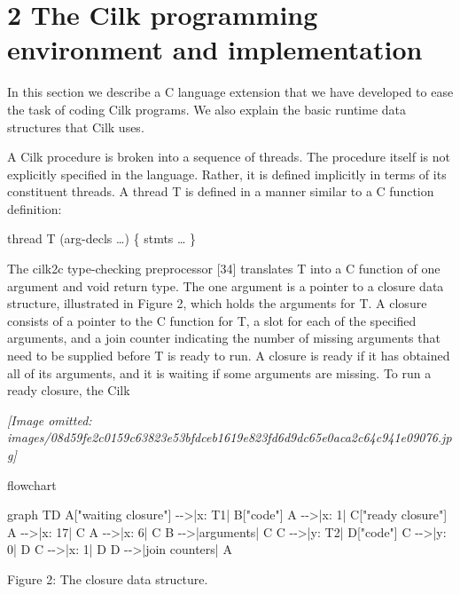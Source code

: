 \documentclass[
]{article}
\newenvironment{Shaded}{}{}
\newcommand{\NormalTok}[1]{#1}
\begin{document}
\section{2 The Cilk programming environment and
implementation}\label{the-cilk-programming-environment-and-implementation}

In this section we describe a C language extension that we have
developed to ease the task of coding Cilk programs. We also explain the
basic runtime data structures that Cilk uses.

A Cilk procedure is broken into a sequence of threads. The procedure
itself is not explicitly specified in the language. Rather, it is
defined implicitly in terms of its constituent threads. A thread T is
defined in a manner similar to a C function definition:

thread T (arg-decls \ldots) \{ stmts \ldots{} \}

The cilk2c type-checking preprocessor {[}34{]} translates T into a C
function of one argument and void return type. The one argument is a
pointer to a closure data structure, illustrated in Figure 2, which
holds the arguments for T. A closure consists of a pointer to the C
function for T, a slot for each of the specified arguments, and a join
counter indicating the number of missing arguments that need to be
supplied before T is ready to run. A closure is ready if it has obtained
all of its arguments, and it is waiting if some arguments are missing.
To run a ready closure, the Cilk

\textit{[Image omitted: images/08d59fe2c0159c63823e53bfdceb1619e823fd6d9dc65e0aca2c64c941e09076.jpg]}

flowchart

\begin{Shaded}
\begin{Highlighting}[]
\NormalTok{graph TD}
\NormalTok{    A["waiting closure"] {-}{-}\textgreater{}|x: T1| B["code"]}
\NormalTok{    A {-}{-}\textgreater{}|x: 1| C["ready closure"]}
\NormalTok{    A {-}{-}\textgreater{}|x: 17| C}
\NormalTok{    A {-}{-}\textgreater{}|x: 6| C}
\NormalTok{    B {-}{-}\textgreater{}|arguments| C}
\NormalTok{    C {-}{-}\textgreater{}|y: T2| D["code"]}
\NormalTok{    C {-}{-}\textgreater{}|y: 0| D}
\NormalTok{    C {-}{-}\textgreater{}|x: 1| D}
\NormalTok{    D {-}{-}\textgreater{}|join counters| A}
\end{Highlighting}
\end{Shaded}

Figure 2: The closure data structure.
\end{document}

